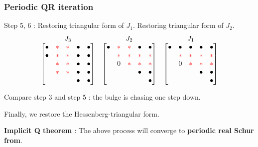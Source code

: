  \begin{frame}
   \frametitle{Periodic QR iteration}
   {\color{green} Step 5, 6} :
   Restoring triangular form of $J_1$.
   Restoring triangular form of $J_2$.
   \[
   \begin{matrix}
      J_3 & J_2 &  J_1 \\
     \begin{bmatrix}
       \uch & \ch & \ch & \uch & \uch \\
       \uch & \ch & \ch & \uch & \uch \\
       & \ch & \ch & \uch & \uch \\
       & \ch & \ch & \uch & \uch \\
       & & & \uch & \uch \\
     \end{bmatrix}
     &
     \begin{bmatrix}
       \uch & \ch & \ch & \uch & \uch \\
       & \ch & \ch & \ch & \ch \\
       & 0 & \ch & \ch & \ch \\
       & & & \uch & \uch \\
       & & & & \uch \\
     \end{bmatrix}
     &
     \begin{bmatrix}
       \uch & \uch & \uch & \uch & \uch \\
       & \ch & \ch & \ch & \ch \\
       & 0 & \ch & \ch & \ch \\
       & & & \uch & \uch \\
       & & & & \uch \\
     \end{bmatrix}
   \end{matrix}
   \]
   
   \pause

   Compare step 3 and step 5 : 
   {\color{red} the bulge is chasing one step down.}
   
   {\color{green} Finally, we restore the Hessenberg-triangular form.}
   
   \pause

   \textbf{Implicit Q theorem \cite{Francis61}} :
   The above process will converge to
   \textbf{periodic real Schur from}.

 \end{frame}